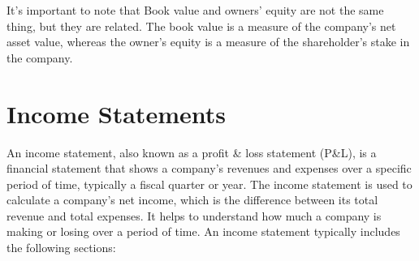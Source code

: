\documentclass{article}
\begin{document}
It's important to note that Book value and owners' equity are not the same thing, but they are related. The book value is a measure of the company's net asset value, whereas the owner's equity is a measure of the shareholder's stake in the company.



\section{Income Statements}

An income statement, also known as a profit \& loss statement (P\&L), is a financial statement that shows a company's revenues and expenses over a specific period of time, typically a fiscal quarter or year. The income statement is used to calculate a company's net income, which is the difference between its total revenue and total expenses. It helps to understand how much a company is making or losing over a period of time. An income statement typically includes the following sections:
\end{document}

